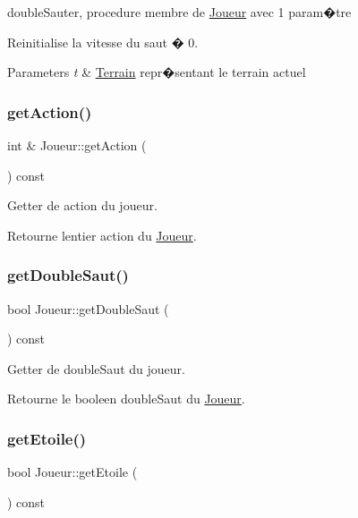 double\+Sauter, procedure membre de \hyperlink{classJoueur}{Joueur} avec 1 param�tre 

Reinitialise la vitesse du saut � 0. 
\begin{DoxyParams}{Parameters}
{\em t} & \hyperlink{classTerrain}{Terrain} repr�sentant le terrain actuel \\
\hline
\end{DoxyParams}
\mbox{\label{classJoueur_a71c07a51eaca56dd5d365ddb48fab5f8}} 
\subsubsection{\texorpdfstring{get\+Action()}{getAction()}}
{\footnotesize\ttfamily int \& Joueur\+::get\+Action (\begin{DoxyParamCaption}{ }\end{DoxyParamCaption}) const}



Getter de action du joueur. 

Retourne l\textquotesingle{}entier action du \hyperlink{classJoueur}{Joueur}. \mbox{\label{classJoueur_a854fae0574f84fa3df548301dd7776fa}} 
\subsubsection{\texorpdfstring{get\+Double\+Saut()}{getDoubleSaut()}}
{\footnotesize\ttfamily bool Joueur\+::get\+Double\+Saut (\begin{DoxyParamCaption}{ }\end{DoxyParamCaption}) const}



Getter de double\+Saut du joueur. 

Retourne le booleen double\+Saut du \hyperlink{classJoueur}{Joueur}. \mbox{\label{classJoueur_a6b3b101eb706defeb2b67d716eecf4d5}} 
\subsubsection{\texorpdfstring{get\+Etoile()}{getEtoile()}}
{\footnotesize\ttfamily bool Joueur\+::get\+Etoile (\begin{DoxyParamCaption}{ }\end{DoxyParamCaption}) const}



